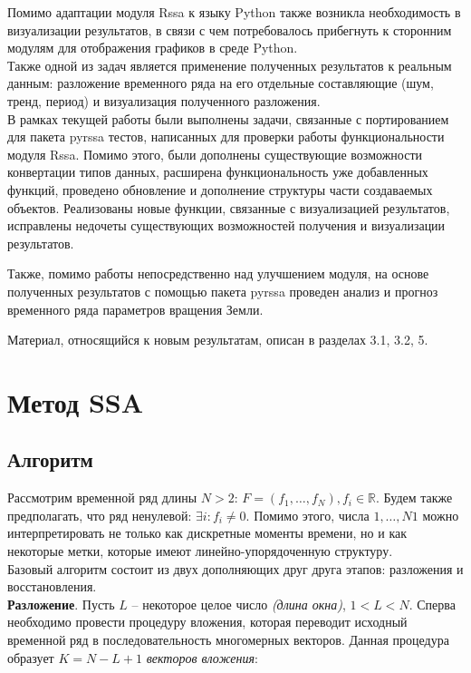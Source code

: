 \documentclass[specialist,
			   substylefile = spbu_report.rtx,
			   subf,href,colorlinks=true, 12pt]{disser}
\begin{document}
Помимо адаптации модуля Rssa к языку Python также возникла необходимость в визуализации результатов, в связи с чем потребовалось прибегнуть к сторонним модулям для отображения графиков в среде Python.\\

Также одной из задач является применение полученных результатов к реальным данным: разложение временного ряда на его отдельные составляющие (шум, тренд, период) и визуализация полученного разложения.\\

В рамках текущей работы были выполнены задачи, связанные с портированием для пакета pyrssa тестов, написанных для проверки работы функциональности модуля Rssa. Помимо этого, были дополнены существующие возможности конвертации типов данных, расширена функциональность уже добавленных функций, проведено обновление и дополнение структуры части создаваемых объектов. Реализованы новые функции, связанные с визуализацией результатов, исправлены недочеты существующих возможностей получения и визуализации результатов.

Также, помимо работы непосредственно над улучшением модуля, на основе полученных результатов с помощью пакета pyrssa проведен анализ и прогноз временного ряда параметров вращения Земли.

Материал, относящийся к новым результатам, описан в разделах 3.1, 3.2, 5.

\chapter{Метод SSA}

\section{Алгоритм}

Рассмотрим временной ряд длины $N > 2$: $F = (f_1, \dots, f_{N}), f_i \in \mathbb{R}$. Будем также предполагать, что ряд ненулевой: $\exists  i: f_i \neq 0$. Помимо этого, числа $1, \dots, N1$ можно интерпретировать не только как дискретные моменты времени, но и как некоторые метки, которые имеют линейно-упорядоченную структуру.\\

Базовый алгоритм состоит из двух дополняющих друг друга этапов: разложения и восстановления.\\



\textbf{Разложение}. Пусть $L$ – некоторое целое число \textit{(длина окна)}, $1 < L < N$. Сперва необходимо провести процедуру вложения, которая переводит исходный временной ряд в последовательность многомерных векторов. Данная процедура образует $K = N - L + 1$ \textit{векторов вложения}:
\end{document}
